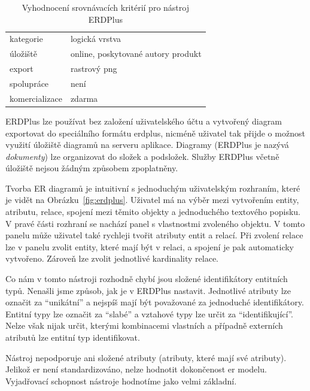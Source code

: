 \begin{table}[!htb]
  \begin{tabularx}{\textwidth}{lX}\toprule
    kategorie      & logická vrstva                     \\
    úložiště       & online, poskytované autory produkt \\
    export         & rastrový \acrshort{png}            \\
    spolupráce     & není                               \\
    komercializace & zdarma
    \\\bottomrule
  \end{tabularx}
  \caption{Vyhodnocení srovnávacích kritérií pro nástroj ERDPlus}
  \label{tab:comparison-erdplus}
\end{table}

ERDPlus lze používat bez založení uživatelského účtu a vytvořený diagram exportovat do speciálního formátu erdplus, nicméně uživatel tak přijde o možnost využití úložiště diagramů na serveru aplikace.
Diagramy (ERDPlus je nazývá \emph{dokumenty}) lze organizovat do složek a podsložek.
Služby ERDPlus včetně úložiště nejsou žádným způsobem zpoplatněny.

Tvorba ER diagramů je intuitivní s jednoduchým uživatelským rozhraním, které je vidět na Obrázku~\ref{fig:erdplus}.
Uživatel má na výběr mezi vytvořením entity, atributu, relace, spojení mezi těmito objekty a jednoduchého textového popisku.
V pravé části rozhraní se nachází panel s vlastnostmi zvoleného objektu.
V tomto panelu může uživatel také rychleji tvořit atributy entit a relací.
Při zvolení relace lze v panelu zvolit entity, které mají být v relaci, a spojení je pak automaticky vytvořeno.
Zároveň lze zvolit jednotlivé kardinality relace.

Co nám v tomto nástroji rozhodně chybí jsou složené identifikátory entitních typů.
Nenašli jsme způsob, jak je v ERDPlus nastavit.
Jednotlivé atributy lze označit za \enquote{unikátní} a nejspíš mají být považované za jednoduché identifikátory.
Entitní typy lze označit za \enquote{slabé} a vztahové typy lze určit za \enquote{identifikující}.
Nelze však nijak určit, kterými kombinacemi vlastních a případně externích atributů lze entitní typ identifikovat.

Nástroj nepodporuje ani složené atributy (atributy, které mají své atributy).
Jelikož \acrshort{er} není standardizováno, nelze hodnotit dokončenost \acrshort{er} modelu.
Vyjadřovací schopnost nástroje hodnotíme jako velmi základní.

